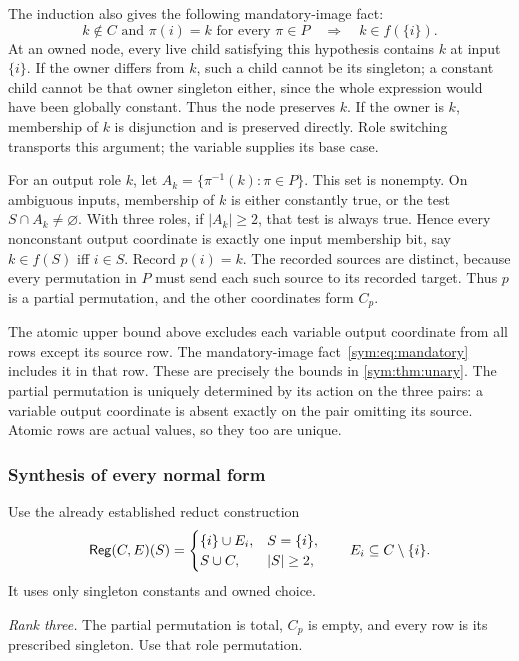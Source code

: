 The induction also gives the following mandatory-image fact:
\begin{equation}\label{sym:eq:mandatory}
 k\notin C\text{ and }\pi(i)=k\text{ for every }\pi\in P
       \quad\Longrightarrow\quad k\in f(\{i\}).
\end{equation}
At an owned node, every live child satisfying this hypothesis contains
$k$ at input $\{i\}$. If the owner differs from $k$, such a child cannot
be its singleton; a constant child cannot be that owner singleton
either, since the whole expression would have been globally constant.
Thus the node preserves $k$. If the owner is $k$, membership of $k$ is
disjunction and is preserved directly. Role switching transports this
argument; the variable supplies its base case.

For an output role $k$, let $A_k=\{\pi^{-1}(k):\pi\in P\}$. This set
is nonempty. On ambiguous inputs, membership of $k$ is either constantly
true, or the test $S\cap A_k\ne\varnothing$. With three roles, if
$|A_k|\geq2$, that test is always true. Hence every nonconstant output
coordinate is exactly one input membership bit, say $k\in f(S)$ iff
$i\in S$. Record $p(i)=k$. The recorded sources are distinct, because
every permutation in $P$ must send each such source to its recorded
target. Thus $p$ is a partial permutation, and the other coordinates
form $C_p$.

The atomic upper bound above excludes each variable output coordinate
from all rows except its source row. The mandatory-image
fact~\eqref{sym:eq:mandatory} includes it in that row. These are precisely
the bounds in \cref{sym:thm:unary}. The partial permutation is
uniquely determined by its action on the three pairs: a variable output
coordinate is absent exactly on the pair omitting its source. Atomic
rows are actual values, so they too are unique.

\subsubsection{Synthesis of every normal form}

Use the already established reduct construction
\[
 \mathsf{Reg}(C,E)(S)=\begin{cases}\{i\}\cup E_i,&S=\{i\},\\
 S\cup C,&|S|\geq2,\end{cases}\qquad E_i\subseteq C\setminus\{i\}.
\]
It uses only singleton constants and owned choice.

\emph{Rank three.} The partial permutation is total, $C_p$ is empty,
and every row is its prescribed singleton. Use that role permutation.

